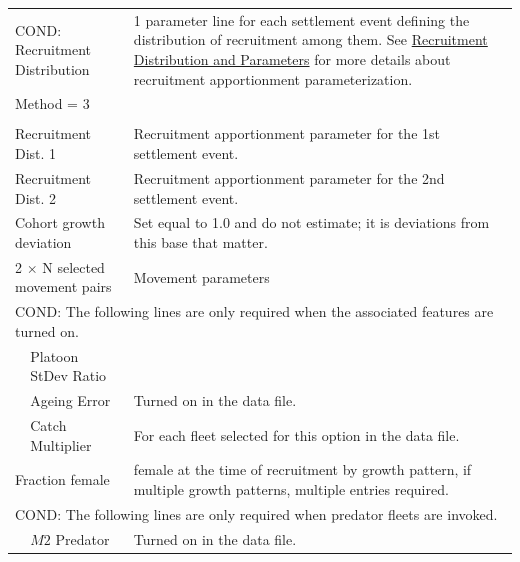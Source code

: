 \begin{longtable}{p{1cm} p{2.25cm} p{10cm}}
	\multicolumn{2}{l}{COND: Recruitment Distribution} \Tstrut & 1 parameter line for each settlement event defining the distribution of recruitment among them. See \hyperlink{recdist}{Recruitment Distribution and Parameters} for more details about recruitment apportionment parameterization. \\
	\multicolumn{2}{l}{Method = 3} \Tstrut & \\
	& & \\
	\multicolumn{2}{l}{Recruitment Dist. 1} \Tstrut & Recruitment apportionment parameter for the 1st settlement event. \\
	\multicolumn{2}{l}{Recruitment Dist. 2} & Recruitment apportionment parameter for the 2nd settlement event. \Bstrut\\
	\hline

	\multicolumn{2}{l}{Cohort growth deviation} \Tstrut & Set equal to 1.0 and do not estimate; it is deviations from this base that matter. \Bstrut\\
	\hline

	\multicolumn{2}{l}{2 $\times$ N selected movement pairs} & Movement parameters \Tstrut\Bstrut\\
	\hline

	\multicolumn{3}{l}{COND: The following lines are only required when the associated features are turned on.} \Tstrut\\
	& Platoon StDev Ratio & \\
	& Ageing Error & Turned on in the data file. \\
	& Catch Multiplier & For each fleet selected for this option in the data file. \\
	\hline

	\multicolumn{2}{l}{Fraction female}\Tstrut & \raisebox{0.1\ht\strutbox}{\hypertarget{SexRatio}{Fraction}} female at the time of recruitment by growth pattern, if multiple growth patterns, multiple entries required. \Bstrut\\
	\hline
	
	\multicolumn{3}{l}{COND: The following lines are only required when predator fleets are invoked.} \Tstrut\\
	& $M2$ Predator & Turned on in the data file. \\
	\hline
\end{longtable}


